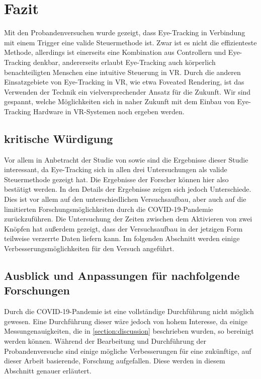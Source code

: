
\chapter{Fazit}
Mit den Probandenversuchen wurde gezeigt, dass Eye-Tracking in Verbindung mit einem Trigger eine valide Steuermethode ist. Zwar ist es nicht die effizienteste Methode, allerdings ist einerseits eine Kombination aus Controllern und Eye-Tracking denkbar, andererseits erlaubt Eye-Tracking auch körperlich benachteiligten Menschen eine intuitive Steuerung in VR. Durch die anderen Einsatzgebiete von Eye-Tracking in VR, wie etwa Foveated Rendering, ist das Verwenden der Technik ein vielversprechender Ansatz für die Zukunft. Wir sind gespannt, welche Möglichkeiten sich in naher Zukunft mit dem Einbau von Eye-Tracking Hardware in VR-Systemen noch ergeben werden.

\section{kritische Würdigung}
Vor allem in Anbetracht der Studie von \citeauthor{Pai.2019} sowie \citeauthor{D.Kumar.2016} sind die Ergebnisse dieser Studie interessant, da Eye-Tracking sich in allen drei Untersuchungen als valide Steuermethode gezeigt hat. Die Ergebnisse der Forscher können hier also bestätigt werden. In den Details der Ergebnisse zeigen sich jedoch Unterschiede. Dies ist vor allem auf den unterschiedlichen Versuchsaufbau, aber auch auf die limitierten Forschungsmöglichkeiten durch die COVID-19-Pandemie zurückzuführen. Die Untersuchung der Zeiten zwischen dem Aktivieren von zwei Knöpfen hat außerdem gezeigt, dass der Versuchsaufbau in der jetzigen Form teilweise verzerrte Daten liefern kann. Im folgenden Abschnitt werden einige Verbesserungsmöglichkeiten für den Versuch angeführt. 

\section{Ausblick und Anpassungen für nachfolgende Forschungen}
Durch die COVID-19-Pandemie ist eine vollständige Durchführung nicht möglich gewesen. Eine Durchführung dieser wäre jedoch von hohem Interesse, da einige Messungenauigkeiten, die in \autoref{section:discussion} beschrieben wurden, so bereinigt werden können. Während der Bearbeitung und Durchführung der Probandenversuche sind einige mögliche Verbesserungen für eine zukünftige, auf dieser Arbeit basierende, Forschung aufgefallen. Diese werden in diesem Abschnitt genauer erläutert. 
